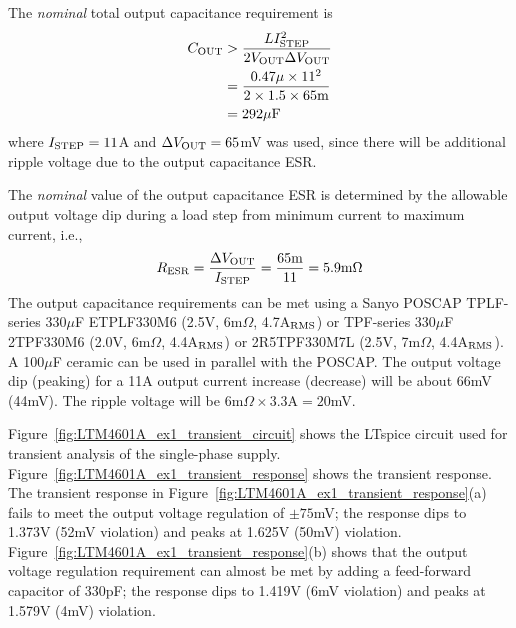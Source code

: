 The {\em nominal} total output capacitance requirement is
%
\begin{equation}
\begin{split}
C_{\rm OUT} &> \frac{LI_{\rm STEP}^2}{2V_{\rm OUT}\Delta V_{\rm OUT}}\\
&= \frac{0.47\mu\times 11^2}{2\times1.5\times65\text{m}}\\
&= 292\mu\text{F}
\end{split}
\end{equation}
%
%
where $I_{\rm STEP}=11$A and $\Delta V_{\rm OUT} = 65$mV was
used, since there will be additional ripple voltage due to 
the output capacitance ESR.

The {\em nominal} value of the output capacitance ESR is determined by
the allowable output voltage dip during a load step from minimum current
to maximum current, i.e.,
%
\begin{equation}
R_{\rm ESR} = \frac{\Delta V_{\rm OUT}}{I_{\rm STEP}} = 
\frac{65\text{m}}{11} = 5.9\text{m}\Omega
\end{equation}
%
The output capacitance requirements can be met using a
Sanyo POSCAP TPLF-series
330$\mu$F ETPLF330M6 (2.5V, 6m$\Omega$, 4.7A$_{\rm RMS}$)
or TPF-series
330$\mu$F 2TPF330M6 (2.0V, 6m$\Omega$, 4.4A$_{\rm RMS}$)
or 2R5TPF330M7L (2.5V, 7m$\Omega$, 4.4A$_{\rm RMS}$).
A 100$\mu$F ceramic can be used in parallel with the POSCAP.
%
The output voltage dip (peaking) for a 11A output current increase
(decrease) will be about 66mV (44mV). The ripple voltage will
be $6\text{m}\Omega \times 3.3\text{A} = 20$mV.

Figure~\ref{fig:LTM4601A_ex1_transient_circuit} shows the LTspice
circuit used for transient analysis of the single-phase supply.
Figure~\ref{fig:LTM4601A_ex1_transient_response} shows the
transient response.
%
The transient response in 
Figure~\ref{fig:LTM4601A_ex1_transient_response}(a) fails to meet
the output voltage regulation of $\pm75$mV; the response dips to
1.373V (52mV violation) and peaks at 1.625V (50mV) violation.
Figure~\ref{fig:LTM4601A_ex1_transient_response}(b) shows that
the output voltage regulation requirement can almost be met
by adding a feed-forward capacitor of 330pF;  the response dips to
1.419V (6mV violation) and peaks at 1.579V (4mV) violation.

